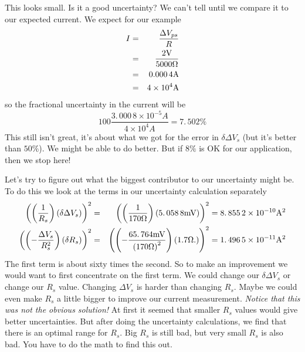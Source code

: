 This looks small. Is it a good uncertainty? We can't tell until we compare
it to our expected current. We expect for our example 
\begin{eqnarray*}
I &=&\frac{\Delta V_{ps}}{R} \\
&=&\frac{2\unit{V}}{5000\unit{%
\Omega%
}} \\
&=&\allowbreak 0.000\,4\unit{A} \\
&=&4\times 10^{4}\unit{A}
\end{eqnarray*}%
so the fractional uncertainty in the current will be 
\begin{equation*}
100\frac{3.\,\allowbreak 000\,8\times 10^{-5}\unit{A}}{4\times 10^{4}\unit{A}%
}=7.\,\allowbreak 502\%
\end{equation*}%
This still isn't great, it's about what we got for the error in $\delta
\Delta V_{s}$ (but it's better than $50\%$). We might be able to do better.
But if $8\%$ is OK for our application, then we stop here!

Let's try to figure out what the biggest contributor to our uncertainty
might be. To do this we look at the terms in our uncertainty calculation
separately%
\begin{eqnarray*}
\left( \left( \frac{1}{R_{s}}\right) \left( \delta \Delta V_{s}\right)
\right) ^{2} &=&\left( \left( \frac{1}{170\unit{%
\Omega%
}}\right) \left( 5.\,\allowbreak 058\,8\unit{mV}\right) \right)
^{2}=\allowbreak 8.\,\allowbreak 855\,2\times 10^{-10}\unit{A}^{2} \\
\left( \left( -\frac{\Delta V_{s}}{R_{s}^{2}}\right) \left( \delta
R_{s}\right) \right) ^{2} &=&\left( \left( -\frac{65.\,\allowbreak 764\unit{%
mV}}{\left( 170\unit{%
\Omega%
}\right) ^{2}}\right) \left( 1.7\unit{%
\Omega%
}.\right) \right) ^{2}=\allowbreak 1.\,\allowbreak 496\,5\times 10^{-11}%
\unit{A}^{2}
\end{eqnarray*}%
The first term is about sixty times the second. So to make an improvement we
would want to first concentrate on the first term. We could change our $%
\delta \Delta V_{s}$ or change our $R_{s}$ value. Changing $\Delta V_{s}$ is
harder than changing $R_{s}.$ Maybe we could even make $R_{s}$ a little
bigger to improve our current measurement. \emph{Notice that this was not
the obvious solution!} At first it seemed that smaller $R_{s}$ values would
give better uncertainties. But after doing the uncertainty calculations, we
find that there is an optimal range for $R_{s}.$ Big $R_{s}$ is still bad,
but very small $R_{s}$ is also bad. You have to do the math to find this out.

